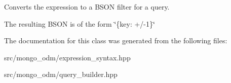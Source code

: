 Converts the expression to a B\+S\+ON filter for a query. 

The resulting B\+S\+ON is of the form \char`\"{}\{key\+: +/-\/1\}\char`\"{} 

The documentation for this class was generated from the following files\+:\begin{DoxyCompactItemize}
\item 
src/mongo\+\_\+odm/expression\+\_\+syntax.\+hpp\item 
src/mongo\+\_\+odm/query\+\_\+builder.\+hpp\end{DoxyCompactItemize}

